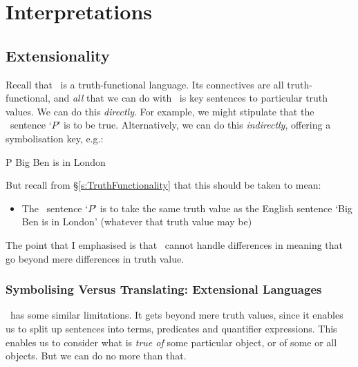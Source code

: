 \part{Interpretations}
\label{ch.semantics}


\chapter{Extensionality}\label{s:Interpretations}

Recall that \TFL\ is a truth-functional language. Its connectives are all truth-functional, and \emph{all} that we can do with \TFL\ is key sentences to particular truth values. We can do this \emph{directly}. For example, we might stipulate that the \TFL\ sentence `$P$' is to be true. Alternatively, we can do this \emph{indirectly}, offering a symbolisation key, e.g.:
	\begin{ekey}
		\item[P] Big Ben is in London
	\end{ekey}
But recall from §\ref{s:TruthFunctionality} that this should be taken to mean:
	\begin{itemize}
		\item The \TFL\ sentence `$P$' is to take the same truth value as the English sentence `Big Ben is in London' (whatever that truth value may be)
	\end{itemize}
The point that I emphasised is that \TFL\ cannot handle differences in meaning that go beyond mere differences in truth value.


\section{Symbolising Versus Translating: Extensional Languages}
\FOL\ has some similar limitations. It gets beyond mere truth values, since it enables us to split up sentences into terms, predicates and quantifier expressions. This enables us to consider what is \emph{true of} some particular object, or of some or all objects. But we can do no more than that. 

